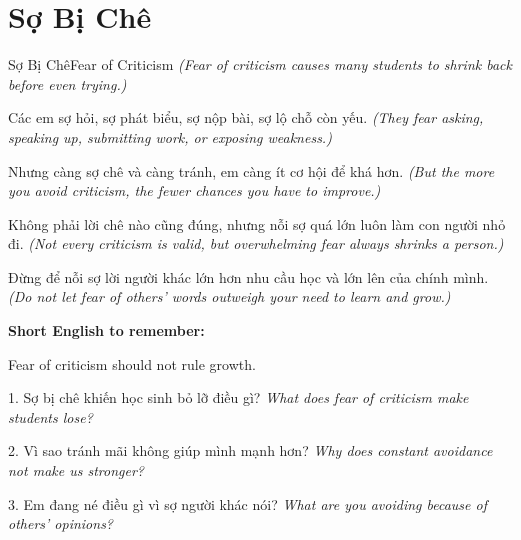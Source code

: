 \section{Sợ Bị Chê}
\begin{truyen}{Sợ Bị Chê}{Fear of Criticism}
\textit{(Fear of criticism causes many students to shrink back before even trying.)}

Các em sợ hỏi, sợ phát biểu, sợ nộp bài, sợ lộ chỗ còn yếu.
\textit{(They fear asking, speaking up, submitting work, or exposing weakness.)}

Nhưng càng sợ chê và càng tránh, em càng ít cơ hội để khá hơn.
\textit{(But the more you avoid criticism, the fewer chances you have to improve.)}

Không phải lời chê nào cũng đúng, nhưng nỗi sợ quá lớn luôn làm con người nhỏ đi.
\textit{(Not every criticism is valid, but overwhelming fear always shrinks a person.)}
\end{truyen}

\begin{baihoc}
Đừng để nỗi sợ lời người khác lớn hơn nhu cầu học và lớn lên của chính mình.
\textit{(Do not let fear of others' words outweigh your need to learn and grow.)}
\end{baihoc}

\begin{ghinhoanh}
\textbf{Short English to remember:}

Fear of criticism should not rule growth.

\end{ghinhoanh}

\begin{tuhocnhanh}
1. Sợ bị chê khiến học sinh bỏ lỡ điều gì? \textit{What does fear of criticism make students lose?}

2. Vì sao tránh mãi không giúp mình mạnh hơn? \textit{Why does constant avoidance not make us stronger?}

3. Em đang né điều gì vì sợ người khác nói? \textit{What are you avoiding because of others' opinions?}
\end{tuhocnhanh}
\ngancach

